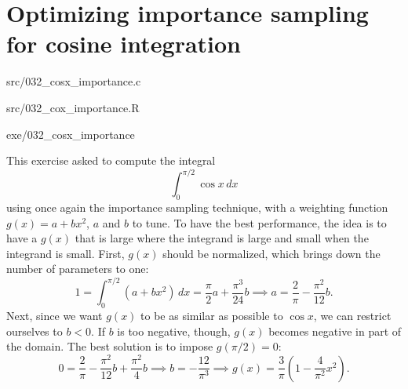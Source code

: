 \section{Optimizing importance sampling for cosine integration}\label{ex:032}

\begin{sourcefiles}
  \item[Source codes] src/032\_cosx\_importance.c
  \item[Analysis scripts] src/032\_cox\_importance.R
  \item[Executables] exe/032\_cosx\_importance
\end{sourcefiles}

This exercise asked to compute the integral
\begin{equation}
  \int_{0}^{\pi/2} \cos x \, dx
\end{equation}
using once again the importance sampling technique, with a weighting function
$g(x) = a + bx^2$, $a$ and $b$ to tune. To have the best performance, the idea
is to have a $g(x)$ that is large where the integrand is large and small when
the integrand is small. First, $g(x)$ should be normalized, which brings down
the number of parameters to one:
\begin{equation}
  1 = \int_{0}^{\pi/2} (a + bx^{2})\, dx = \frac{\pi}{2}a + \frac{\pi^{3}}{24}b
  \implies a = \frac{2}{\pi} - \frac{\pi^{2}}{12}b.
\end{equation}
Next, since we want $g(x)$ to be as similar as possible to $\cos x$, we can
restrict ourselves to $b < 0$. If $b$ is too negative, though, $g(x)$ becomes
negative in part of the domain. The best solution is to impose $g(\pi/2) = 0$:
\begin{equation}
  0 = \frac{2}{\pi} - \frac{\pi^{2}}{12}b + \frac{\pi^{2}}{4}b \implies b =
  -\frac{12}{\pi^{3}} \implies g(x) = \frac{3}{\pi}\left(1 -
  \frac{4}{\pi^{2}}x^{2}\right).
\end{equation}

